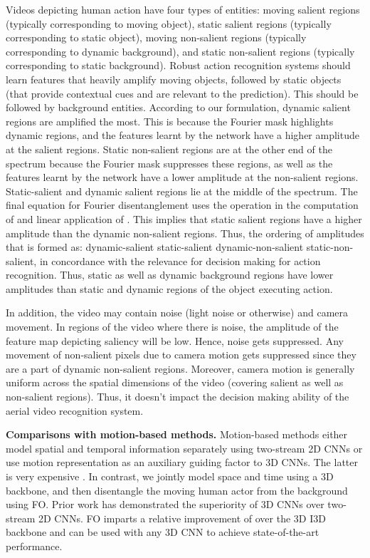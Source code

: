 \documentclass[runningheads]{llncs}
\begin{document}
Videos depicting human action have four types of entities: moving salient regions (typically corresponding to moving object), static salient regions (typically corresponding to static object), moving non-salient regions (typically corresponding to dynamic background), and static non-salient regions (typically corresponding to static background). Robust action recognition systems should learn features that heavily amplify moving objects, followed by static objects (that provide contextual cues and are relevant to the prediction). This should be followed by background entities. According to our formulation, dynamic salient regions are amplified the most. This is because the Fourier mask highlights dynamic regions, and the features learnt by the network have a higher amplitude at the salient regions. Static non-salient regions are at the other end of the spectrum because the Fourier mask suppresses these regions, as well as the features learnt by the network have a lower amplitude at the non-salient regions. Static-salient and dynamic salient regions lie at the middle of the spectrum. The final equation for Fourier disentanglement uses the  operation in the computation of  and linear application of . This implies that static salient regions have a higher amplitude than the dynamic non-salient regions. Thus, the ordering of amplitudes that is formed as: dynamic-salient  static-salient  dynamic-non-salient  static-non-salient, in concordance with the relevance for decision making for action recognition. Thus, static as well as dynamic background regions have lower amplitudes than static and dynamic regions of the object executing action. 

In addition, the video may contain noise (light noise or otherwise) and camera movement. In regions of the video where there is noise, the amplitude of the feature map depicting saliency will be low. Hence, noise gets suppressed. Any movement of non-salient pixels due to camera motion gets suppressed since they are a part of dynamic non-salient regions. Moreover, camera motion is generally uniform across the spatial dimensions of the video (covering salient as well as non-salient regions). Thus, it doesn't impact the decision making ability of the aerial video recognition system.  

\noindent \textbf{Comparisons with motion-based methods.} Motion-based methods either model spatial and temporal information separately using two-stream 2D CNNs \cite{lee2018motion} or use motion representation as an auxiliary guiding factor to 3D CNNs. The latter is very expensive \cite{piergiovanni2019representation}. In contrast, we jointly model space and time using a 3D backbone, and then disentangle the moving human actor from the background using FO. Prior work has demonstrated the superiority \cite{feichtenhofer2019slowfast,feichtenhofer2020x3d} of 3D CNNs over two-stream 2D CNNs. FO imparts a relative improvement of  over the 3D I3D backbone and can be used with any 3D CNN to achieve state-of-the-art performance.
\end{document}
